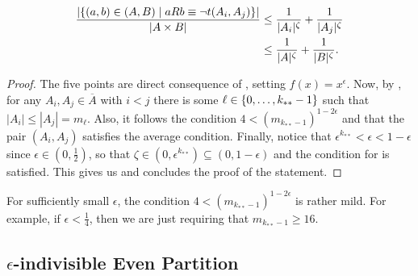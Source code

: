 \begin{lemma}
\begin{enumerate}
                    \[
                        \begin{split}
                            \frac{|\{ (a,b) \in (A,B) \mid a R b \equiv \neg t(A_i,A_j) \}|}{|A \times B|}
                                &\leq \frac{1}{|A_i|^\zeta} + \frac{1}{|A_j|^\zeta} \\
                                &\leq \frac{1}{|A|^\zeta} + \frac{1}{|B|^\zeta}.
                        \end{split}
                    \]
            \end{enumerate}
            \begin{proof}
                The five points are direct consequence of ,
                setting $f(x) = x^\epsilon$.
                Now, by , for any $A_i, A_j \in \overline{A}$ with $i < j$
                there is some $\ell \in \{ 0, \dots, k_{**}-1 \}$ such that $|A_i| \leq |A_j| = m_\ell$.
                Also, it follows the condition $4 < (m_{k_{**}-1})^{1-2\epsilon}$ and 
                that the pair $(A_i,A_j)$ satisfies the average condition.
                Finally, notice that $\epsilon^{k_{**}} < \epsilon < 1 - \epsilon$ since $\epsilon \in (0, \frac{1}{2})$,
                so that $\zeta \in (0, \epsilon ^ {k_{**}}) \subseteq (0, 1 - \epsilon)$ and the condition for
                 is satisfied.
                This gives us  and concludes the proof of the statement.
            \end{proof}
        \end{lemma}

        \begin{remark}
            For sufficiently small $\epsilon$, the condition $4 < (m_{k_{**}-1})^{1-2\epsilon}$ is rather mild.
            For example, if $\epsilon < \frac{1}{4}$, then we are just requiring that $m_{k_{**}-1} \geq 16$.
        \end{remark}

    \subsection{$\epsilon$-indivisible Even Partition} \label{subsec:subsection_4.2}

